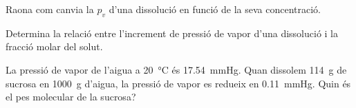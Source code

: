 \begin{exr}
    Raona com canvia la $p_v$ d'una dissolució en funció de la seva concentració.
    \end{exr}
    
    \begin{exr}
    Determina la relació entre l'increment de pressió de vapor d'una dissolució i la fracció molar del solut.
    \end{exr}
    
    \begin{exr}
    La pressió de vapor de l'aigua a \qty{20}{\celsius} és \qty{17.54}{\mmHg}. Quan dissolem \qty{114}{\gram} de sucrosa en \qty{1000}{\gram} d'aigua, la pressió de vapor es redueix en \qty{0.11}{\mmHg}. Quin és el pes molecular de la sucrosa?
    \end{exr}
